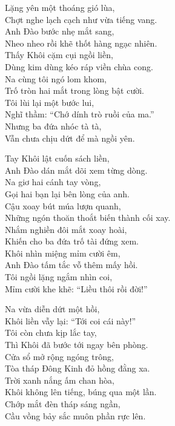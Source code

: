 \documentclass[../main.tex]{subfiles}
\begin{document}
\begin{center}

  Lặng yên một thoáng gió lùa,\\
  Chợt nghe lạch cạch như vừa tiếng vang.\\
  Anh Đào bước nhẹ mắt sang,\\
  Nheo nheo rồi khẽ thốt hàng ngạc nhiên.\\
  Thấy Khôi cặm cụi ngồi liền,\\
  Dùng kim dùng kéo ráp viền chùa cong.\\
  Na cùng tôi ngó lom khom,\\
  Trố tròn hai mắt trong lòng bật cười.\\
  Tôi lùi lại một bước lui,\\
  Nghĩ thầm: ``Chớ dính trò ruồi của ma.''\\
  Nhưng ba đứa nhóc tà tà,\\
  Vẫn chưa chịu dứt để mà ngồi yên.


  Tay Khôi lật cuốn sách liền,\\
  Anh Đào dán mắt dõi xem từng dòng.\\
  Na giơ hai cánh tay vòng,\\
  Gọi hai bạn lại bên lòng của anh.\\
  Cậu xoay bút múa lượn quanh,\\
  Những ngón thoăn thoắt biến thành cối xay.\\
  Nhắm nghiền đôi mắt xoay hoài,\\
  Khiến cho ba đứa trố tài đứng xem.\\
  Khôi nhìn miệng mỉm cười êm,\\
  Anh Đào tấm tắc vỗ thêm mấy hồi.\\
  Tôi ngồi lặng ngắm nhìn coi,\\
  Mỉm cười khe khẽ: ``Liều thôi rồi đời!''


  Na vừa diễn dứt một hồi,\\
  Khôi liền vẫy lại: ``Tới coi cái này!''\\
  Tôi còn chưa kịp lắc tay,\\
  Thì Khôi đã bước tới ngay bên phòng.\\
  Cửa sổ mở rộng ngóng trông,\\
  Tòa tháp Đông Kinh đỏ hồng đằng xa.\\
  Trời xanh nắng ấm chan hòa,\\
  Khôi không lên tiếng, búng qua một lần.\\
  Chớp mắt đèn tháp sáng ngần,\\
  Cầu vồng bảy sắc muôn phần rực lên.


\end{center}
\end{document}
